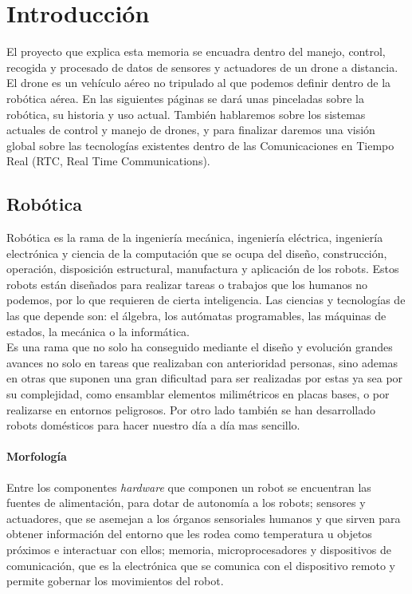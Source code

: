 \chapter{Introducción}

El proyecto que explica esta memoria se encuadra dentro del manejo, control, recogida y procesado de datos de sensores y actuadores de un drone a distancia. El drone es un vehículo aéreo no tripulado al que podemos definir dentro de la robótica aérea. En las siguientes páginas se dará unas pinceladas sobre la robótica, su historia y uso actual. También hablaremos sobre los sistemas actuales de control y manejo de drones, y para finalizar daremos una visión global sobre las tecnologías existentes dentro de las Comunicaciones en Tiempo Real (RTC, Real Time Communications).\\

\section{Robótica}

Robótica es la rama de la ingeniería mecánica, ingeniería eléctrica, ingeniería electrónica y ciencia de la computación que se ocupa del diseño, construcción, operación, disposición estructural, manufactura y aplicación de los robots. Estos robots están diseñados para realizar tareas o trabajos que los humanos no podemos, por lo que requieren de cierta inteligencia. Las ciencias y tecnologías de las que depende son: el álgebra, los autómatas programables, las máquinas de estados, la mecánica o la informática.\\

Es una rama que no solo ha conseguido mediante el diseño y evolución grandes avances no solo en tareas que realizaban con anterioridad personas, sino ademas en otras que suponen una gran dificultad para ser realizadas por estas ya sea por su complejidad, como ensamblar elementos milimétricos en placas bases, o por realizarse en entornos peligrosos. Por otro lado también se han desarrollado robots domésticos para hacer nuestro día a día mas sencillo.\\

\subsubsection{Morfología}

Entre los componentes \emph{hardware} que componen un robot se encuentran las fuentes de alimentación, para dotar de autonomía a los robots; sensores y actuadores, que se asemejan a los órganos sensoriales humanos y que sirven para obtener información del entorno que les rodea como temperatura u objetos próximos e interactuar con ellos; memoria, microprocesadores y dispositivos de comunicación, que es la electrónica que se comunica con el dispositivo remoto y permite gobernar los movimientos del robot.\\

